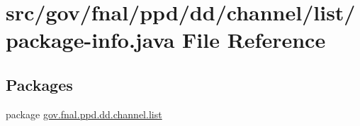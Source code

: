 \hypertarget{gov_2fnal_2ppd_2dd_2channel_2list_2package-info_8java}{\section{src/gov/fnal/ppd/dd/channel/list/package-\/info.java File Reference}
\label{gov_2fnal_2ppd_2dd_2channel_2list_2package-info_8java}
}
\subsection*{Packages}
\begin{DoxyCompactItemize}
\item 
package \hyperlink{namespacegov_1_1fnal_1_1ppd_1_1dd_1_1channel_1_1list}{gov.\-fnal.\-ppd.\-dd.\-channel.\-list}
\end{DoxyCompactItemize}
